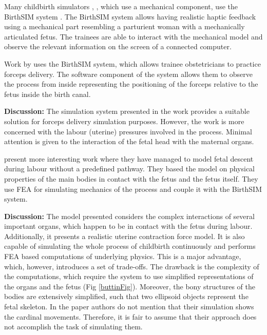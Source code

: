 Many childbirth simulators \citep{Moreau}, \citep{BUTTIN}, which use a mechanical component, use the BirthSIM system \citep{BIRTHSIM}. The BirthSIM system allows having realistic haptic feedback using a mechanical part resembling a parturient woman with a mechanically articulated fetus. The trainees are able to interact with the mechanical model and observe the relevant information on the screen of a connected computer.

Work by \textbf{\citet{Moreau}} uses the BirthSIM system, which allows trainee obstetricians to practice forceps delivery. The software component of the system allows them to observe the process from inside representing the positioning of the forceps relative to the fetus inside the birth canal.

\textbf{Discussion:} The simulation system presented in the work provides a suitable solution for forceps delivery simulation purposes. However, the work is more concerned with the labour (uterine) pressures involved in the process. Minimal attention is given to the interaction of the fetal head with the maternal organs.

\textbf{\citet{BUTTIN}} present more interesting work where they have managed to model fetal descent during labour without a predefined pathway. They based the model on physical properties of the main bodies in contact with the fetus and the fetus itself. They use FEA for simulating mechanics of the process and couple it with the BirthSIM system.


\textbf{Discussion:} The model presented considers the complex interactions of several important organs, which happen to be in contact with the fetus during labour. Additionally, it presents a realistic uterine contraction force model. It is also capable of simulating the whole process of childbirth continuously and performs FEA based computations of underlying physics. This is a major advantage, which, however, introduces a set of trade-offs. The drawback is the complexity of the computations, which require the system to use simplified representations of the organs and the fetus (Fig \ref{buttinFig}). Moreover, the bony structures of the bodies are extensively simplified, such that two ellipsoid objects represent the fetal skeleton. In the paper authors do not mention that their simulation shows the cardinal movements. Therefore, it is fair to assume that their approach does not accomplish the task of simulating them.


